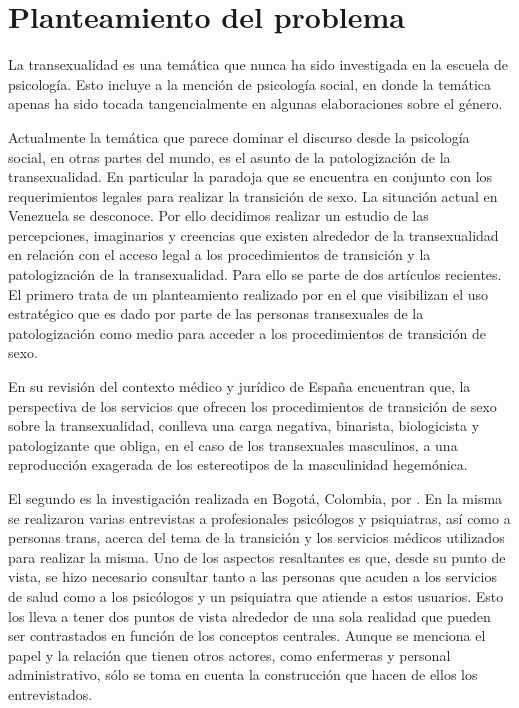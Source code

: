 \section{Planteamiento del problema}

La transexualidad es una temática que nunca ha sido investigada en la escuela de
psicología. Esto incluye a la mención de psicología social, en donde la temática
apenas ha sido tocada tangencialmente en algunas elaboraciones sobre el género.

Actualmente la temática que parece dominar el discurso desde la psicología
social, en otras partes del mundo, es el asunto de la patologización de la
transexualidad. En particular la paradoja que se encuentra en conjunto con los
requerimientos legales para realizar la transición de sexo. La situación actual
en Venezuela se desconoce. Por ello decidimos realizar un estudio de las
percepciones, imaginarios y creencias que existen alrededor de la transexualidad
en relación con el acceso legal a los procedimientos de transición y la
patologización de la transexualidad. Para ello se parte de dos artículos
recientes. El primero trata de un planteamiento realizado por
\textcite{Coll-Planas2015} en el que visibilizan el uso estratégico que es dado
por parte de las personas transexuales de la patologización como medio para
acceder a los procedimientos de transición de sexo.

En su revisión del contexto médico y jurídico de España encuentran que, la
perspectiva de los servicios que ofrecen los procedimientos de transición de
sexo sobre la transexualidad, conlleva una carga negativa, binarista,
biologicista y patologizante que obliga, en el caso de los transexuales
masculinos, a una reproducción exagerada de los estereotipos de la masculinidad
hegemónica.

El segundo es la investigación realizada en Bogotá, Colombia, por
\textcite{LassoBaez2014}. En la misma se realizaron varias entrevistas a
profesionales psicólogos y psiquiatras, así como a personas trans, acerca del
tema de la transición y los servicios médicos utilizados para realizar la misma.
Uno de los aspectos resaltantes es que, desde su punto de vista, se hizo
necesario consultar tanto a las personas que acuden a los servicios de salud
como a los psicólogos y un psiquiatra que atiende a estos usuarios. Esto los
lleva a tener dos puntos de vista alrededor de una sola realidad que pueden ser
contrastados en función de los conceptos centrales. Aunque se menciona el papel
y la relación que tienen otros actores, como enfermeras y personal
administrativo, sólo se toma en cuenta la construcción que hacen de ellos los
entrevistados.


